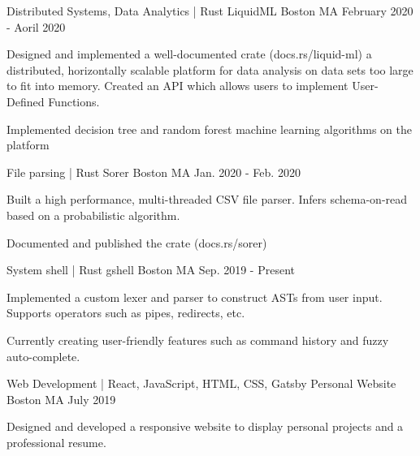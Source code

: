 

\begin{cventries}
    \cventry
    {Distributed Systems, Data Analytics | Rust} %
    {LiquidML} %
    {Boston MA} %
    {February 2020 - Aoril 2020} %
    {
      \begin{cvitems} %
        \item {Designed and implemented a well-documented crate (docs.rs/liquid-ml) a distributed, horizontally scalable platform for data analysis on data sets too large to fit into memory. Created an API which allows users to implement User-Defined Functions.}
        \item {Implemented decision tree and random forest machine learning algorithms on the platform}
      \end{cvitems}
    }

    \cventry
    {File parsing | Rust} %
    {Sorer} %
    {Boston MA} %
    {Jan. 2020 - Feb. 2020} %
    {
      \begin{cvitems} %
        \item {Built a high performance, multi-threaded CSV file parser. Infers schema-on-read based on a probabilistic algorithm.}
        \item {Documented and published the crate (docs.rs/sorer)}
      \end{cvitems}
    }

    \cventry
    {System shell | Rust} %
    {gshell} %
    {Boston MA} %
    {Sep. 2019 - Present} %
    {
      \begin{cvitems} %
        \item {Implemented a custom lexer and parser to construct ASTs from user input. Supports operators such as pipes, redirects, etc.}
        \item {Currently creating user-friendly features such as command history and fuzzy auto-complete.}
      \end{cvitems}
    }

  \cventry
    {Web Development | React, JavaScript, HTML, CSS, Gatsby} %
    {Personal Website} %
    {Boston MA} %
    {July 2019} %
    {
      \begin{cvitems} %
        \item {Designed and developed a responsive website to display personal projects and a professional resume.}
      \end{cvitems}
    }
    

\end{cventries}
